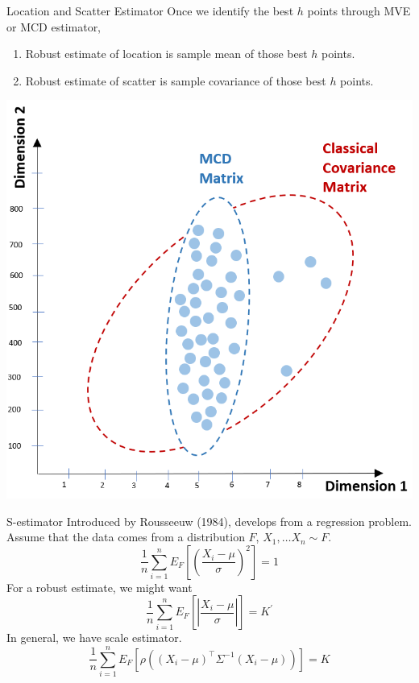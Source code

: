 \documentclass[10pt,xcolor=svgnames]{beamer} %
\newcommand{\tr}{^{\intercal}}
\begin{document}
\begin{frame}{Location and Scatter Estimator}
    Once we identify the best $h$ points through MVE or MCD estimator,
    \begin{minipage}{0.5\textwidth}
        \begin{enumerate}
            \item Robust estimate of location is sample mean of those best $h$ points.
            \item Robust estimate of scatter is sample covariance of those best $h$ points.
        \end{enumerate}
    \end{minipage}
    \hfill
    \begin{minipage}{0.48\textwidth}
        \includegraphics[width = \textwidth]{compare.png}
    \end{minipage}
\end{frame}



\begin{frame}{S-estimator}
    Introduced by Rousseeuw (1984), develops from a regression problem.\\
    Assume that the data comes from a distribution $F$, $X_1, \dots X_n \sim F$.
    \begin{equation*}
        \dfrac{1}{n}\sum_{i=1}^n E_F\left[ \left( \dfrac{X_i - \mu}{\sigma} \right)^2 \right] = 1
    \end{equation*}
    For a robust estimate, we might want
    \begin{equation*}
        \dfrac{1}{n}\sum_{i=1}^n E_F\left[ \left\vert \dfrac{X_i - \mu}{\sigma} \right\vert \right] = K^\prime
    \end{equation*}
    In general, we have scale estimator.
    \begin{equation*}
        \dfrac{1}{n}\sum_{i=1}^n E_F\left[ \rho\left( (X_i - \mu)\tr \Sigma^{-1} (X_i - \mu ) \right) \right] = K
    \end{equation*}
\end{frame}
\end{document}
